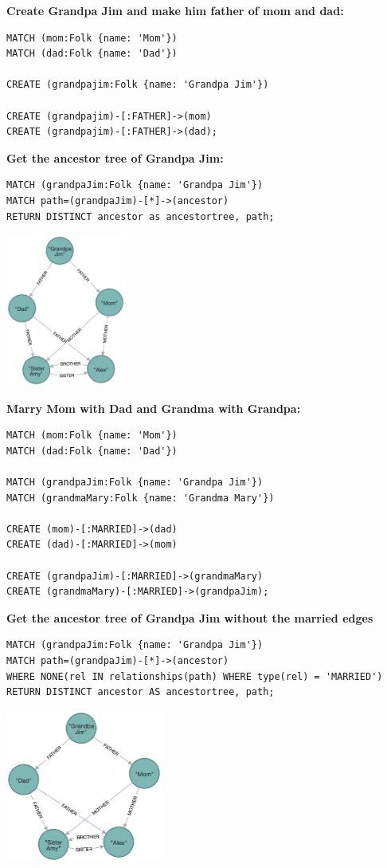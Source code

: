 \documentclass[14pt,a4paper]{extarticle}
\begin{document}
	\noindent \textbf{Create Grandpa Jim and make him father of mom and dad:}
	\begin{lstlisting}[style=sql]
MATCH (mom:Folk {name: 'Mom'})
MATCH (dad:Folk {name: 'Dad'})

CREATE (grandpajim:Folk {name: 'Grandpa Jim'})

CREATE (grandpajim)-[:FATHER]->(mom)
CREATE (grandpajim)-[:FATHER]->(dad);
	\end{lstlisting}

	\pagebreak


	\noindent \textbf{Get the ancestor tree of Grandpa Jim:}
	\begin{lstlisting}[style=sql]
MATCH (grandpaJim:Folk {name: 'Grandpa Jim'})
MATCH path=(grandpaJim)-[*]->(ancestor)
RETURN DISTINCT ancestor as ancestortree, path;
	\end{lstlisting}
	\begin{center}
		\includegraphics[height=5cm]{images/at_jim.png}
	\end{center}

	\noindent \textbf{Marry Mom with Dad and Grandma with Grandpa:}
	\begin{lstlisting}[style=sql]
MATCH (mom:Folk {name: 'Mom'})
MATCH (dad:Folk {name: 'Dad'})

MATCH (grandpaJim:Folk {name: 'Grandpa Jim'})
MATCH (grandmaMary:Folk {name: 'Grandma Mary'})

CREATE (mom)-[:MARRIED]->(dad)
CREATE (dad)-[:MARRIED]->(mom)

CREATE (grandpaJim)-[:MARRIED]->(grandmaMary)
CREATE (grandmaMary)-[:MARRIED]->(grandpaJim);
	\end{lstlisting}

	\noindent \textbf{Get the ancestor tree of Grandpa Jim without the married edges}
	\begin{lstlisting}[style=sql]
MATCH (grandpaJim:Folk {name: 'Grandpa Jim'})
MATCH path=(grandpaJim)-[*]->(ancestor)
WHERE NONE(rel IN relationships(path) WHERE type(rel) = 'MARRIED')
RETURN DISTINCT ancestor AS ancestortree, path;
	\end{lstlisting}
	\begin{center}
		\includegraphics[height=5cm]{images/at_jim_2.png}
	\end{center}
\end{document}

